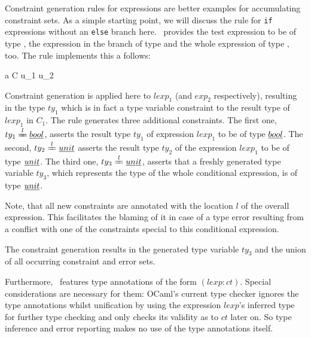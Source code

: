 Constraint generation rules for expressions are better examples for
accumulating constraint sets.
As a simple starting point, we will discuss the rule for \texttt{if} expressions
without an \texttt{else} branch here.
\ocaml\ provides the test expression to be of type , the expression
in the branch of type  and the whole expression of type ,
too. The rule implements this a follows:

\vspace{1em}\centerline{
{\etyjudge {} a C {u_1 \cup u_2}}
}\vspace{1em}

Constraint generation is applied here to $lexp_1$ (and $exp_2$ respectively),
resulting  in the type $ty_1$ which is in fact a type variable constraint to
the result type of $lexp_1$ in $C_1$.
The rule generates three additional constraints.  The first one, $ty_1
\xlongequal l \type{bool}$, asserts the result type $ty_1$ of expression
$lexp_1$ to be of type $\underline{bool}$.
The second, $ty_2 \xlongequal l \type{unit}$ asserts the result type $ty_2$ of
the expression $lexp_1$ to be of type $\underline{unit}$.
The third one, $ty_3 \xlongequal l \type{unit}$, asserts that a freshly
generated type variable $ty_3$, which represents the type of the whole
conditional expression, is of type $\underline{unit}$.

Note, that all new constraints are annotated with the location $l$ of the
overall expression. This facilitates the blaming of it in case of a type error
resulting from a conflict with one of the constraints special to this
conditional expression.

The constraint generation results in the generated type variable $ty_3$ and the
union of all occurring constraint and error sets.

Furthermore, \easyocaml\ features type annotations of the form $(lexp:ct)$.
Special considerations are necessary for them:
OCaml's current type checker ignores the type annotations whilst unification by
using the expression $lexp$'s inferred type for further type checking and only
checks its validity as to $ct$ later on.  So type inference and error reporting
makes no use of the type annotations itself.

